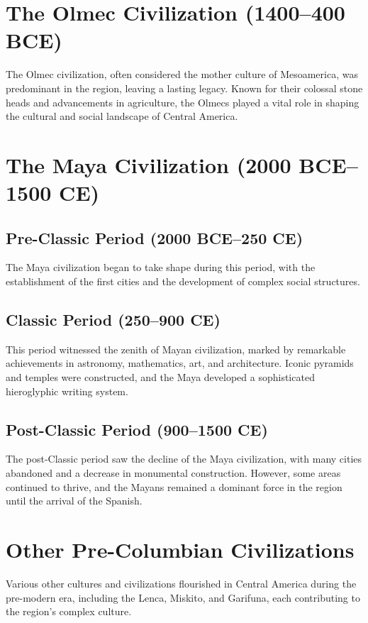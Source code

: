 \documentclass{book}
\begin{document}
\section{The Olmec Civilization (1400–400 BCE)}
\label{sec:olmec-civilization}
The Olmec civilization, often considered the mother culture of Mesoamerica, was predominant in the region, leaving a lasting legacy. Known for their colossal stone heads and advancements in agriculture, the Olmecs played a vital role in shaping the cultural and social landscape of Central America.

\section{The Maya Civilization (2000 BCE–1500 CE)}
\label{sec:mayan-civilization}
\subsection{Pre-Classic Period (2000 BCE–250 CE)}
\label{subsec:pre-classic-maya}
The Maya civilization began to take shape during this period, with the establishment of the first cities and the development of complex social structures.

\subsection{Classic Period (250–900 CE)}
\label{subsec:classic-maya}
This period witnessed the zenith of Mayan civilization, marked by remarkable achievements in astronomy, mathematics, art, and architecture. Iconic pyramids and temples were constructed, and the Maya developed a sophisticated hieroglyphic writing system.

\subsection{Post-Classic Period (900–1500 CE)}
\label{subsec:post-classic-maya}
The post-Classic period saw the decline of the Maya civilization, with many cities abandoned and a decrease in monumental construction. However, some areas continued to thrive, and the Mayans remained a dominant force in the region until the arrival of the Spanish.

\section{Other Pre-Columbian Civilizations}
\label{sec:other-pre-columbian-civilizations}
Various other cultures and civilizations flourished in Central America during the pre-modern era, including the Lenca, Miskito, and Garifuna, each contributing to the region's complex culture.
\end{document}
